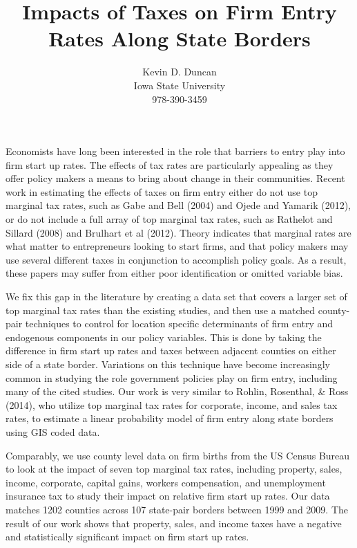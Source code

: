 \documentclass[12 pt,a4paper]{article} %
\date{} %
\begin{document}
\title{Impacts of Taxes on Firm Entry Rates Along State Borders}
\author{Kevin D. Duncan \\ Iowa State University \\ 978-390-3459}
\maketitle

Economists have long been interested in the role that barriers to entry play into firm start up rates. The effects of tax rates are particularly appealing as they offer policy makers a means to bring about change in their communities. Recent work in estimating the effects of taxes on firm entry either do not use top marginal tax rates, such as Gabe and Bell (2004) and Ojede and Yamarik (2012), or do not include a full array of top marginal tax rates, such as Rathelot and Sillard (2008) and Brulhart et al (2012). Theory indicates that marginal rates are what matter to entrepreneurs looking to start firms, and that policy makers may use several different taxes in conjunction to accomplish policy goals. As a result, these papers may suffer from either poor identification or omitted variable bias.

We fix this gap in the literature by creating a data set that covers a larger set of top marginal tax rates than the existing studies, and then use a matched county-pair techniques to control for location specific determinants of firm entry and endogenous components in our policy variables. This is done by taking the difference in firm start up rates and taxes between adjacent counties on either side of a state border. Variations on this technique have become increasingly common in studying the role government policies play on firm entry, including many of the cited studies. Our work is very similar to Rohlin, Rosenthal, \& Ross (2014), who utilize top marginal tax rates for corporate, income, and sales tax rates, to estimate a linear probability model of firm entry along state borders using GIS coded data.

Comparably, we use county level data on firm births from the US Census Bureau to look at the impact of seven top marginal tax rates, including property, sales, income, corporate, capital gains, workers compensation, and unemployment insurance tax to study their impact on relative firm start up rates. Our data matches 1202 counties across 107 state-pair borders between 1999 and 2009. The result of our work shows that property, sales, and income taxes have a negative and statistically significant impact on firm start up rates. 
\end{document}

